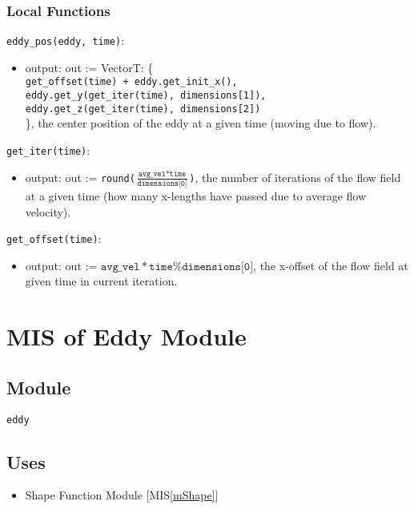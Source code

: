 \documentclass[12pt, titlepage]{article}
\begin{document}
\subsubsection{Local Functions}


\noindent \texttt{eddy\_pos(eddy, time)}:
\begin{itemize}
\item output: out := VectorT: \{\texttt{\\
  get\_offset(time) + eddy.get\_init\_x(),\\
  eddy.get\_y(get\_iter(time), dimensions[1]),\\
  eddy.get\_z(get\_iter(time), dimensions[2])}\\
\}, the center position of the eddy at a given time (moving due to flow).
\end{itemize}

\noindent \texttt{get\_iter(time)}:
\begin{itemize}
\item output: out := \texttt{round($\frac{\texttt{avg\_vel}*\texttt{time}}{\texttt{dimensions[0]}}$)}, the number of iterations of the flow field at a given time (how many x-lengths have passed due to average flow velocity).
\end{itemize}

\noindent \texttt{get\_offset(time)}:
\begin{itemize}
\item output: out := $\texttt{avg\_vel}*\texttt{time} \% \texttt{dimensions[0]}$, the x-offset of the flow field at given time in current iteration.
\end{itemize}


\newpage
\section{MIS of Eddy Module} \label{mEddy} 

\subsection{Module}
\texttt{eddy}

\subsection{Uses}
\begin{itemize}
\item Shape Function Module [MIS\ref{mShape}]
\end{itemize}
\end{document}
